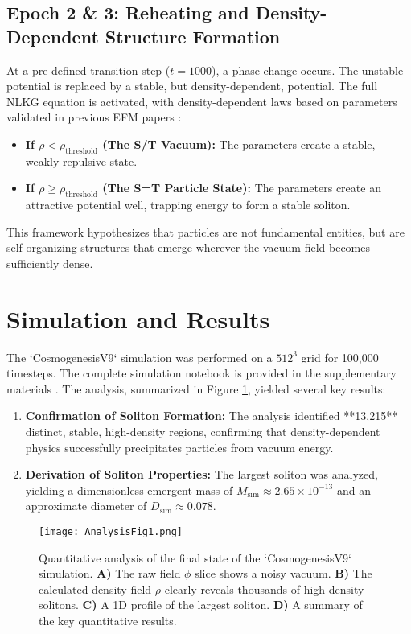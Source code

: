 \documentclass[11pt, twoside]{article}
\begin{document}
\subsection{Epoch 2 \& 3: Reheating and Density-Dependent Structure Formation}
At a pre-defined transition step (\(t=1000\)), a phase change occurs. The unstable potential is replaced by a stable, but density-dependent, potential. The full NLKG equation is activated, with density-dependent laws based on parameters validated in previous EFM papers \citep{EFMDimensionlessPaper, EFMmassgen}:
\begin{itemize}
    \item \textbf{If \(\rho < \rho_{\text{threshold}}\) (The S/T Vacuum):} The parameters create a stable, weakly repulsive state.
    \item \textbf{If \(\rho \geq \rho_{\text{threshold}}\) (The S=T Particle State):} The parameters create an attractive potential well, trapping energy to form a stable soliton.
\end{itemize}
This framework hypothesizes that particles are not fundamental entities, but are self-organizing structures that emerge wherever the vacuum field becomes sufficiently dense.

\section{Simulation and Results}
The `CosmogenesisV9` simulation was performed on a \(512^3\) grid for 100,000 timesteps. The complete simulation notebook is provided in the supplementary materials \citep{FULLNUF}. The analysis, summarized in Figure \ref{fig:emergence}, yielded several key results:
\begin{enumerate}
    \item \textbf{Confirmation of Soliton Formation:} The analysis identified **13,215** distinct, stable, high-density regions, confirming that density-dependent physics successfully precipitates particles from vacuum energy.
    \item \textbf{Derivation of Soliton Properties:} The largest soliton was analyzed, yielding a dimensionless emergent mass of \(M_{\text{sim}} \approx 2.65 \times 10^{-13}\) and an approximate diameter of \(D_{\text{sim}} \approx 0.078\).
\end{enumerate}

\begin{figure}[htbp!]
\centering
\texttt{[image: AnalysisFig1.png]}
\caption{Quantitative analysis of the final state of the `CosmogenesisV9` simulation. \textbf{A)} The raw field \(\phi\) slice shows a noisy vacuum. \textbf{B)} The calculated density field \(\rho\) clearly reveals thousands of high-density solitons. \textbf{C)} A 1D profile of the largest soliton. \textbf{D)} A summary of the key quantitative results.}
\label{fig:emergence}
\end{figure}
\end{document}
